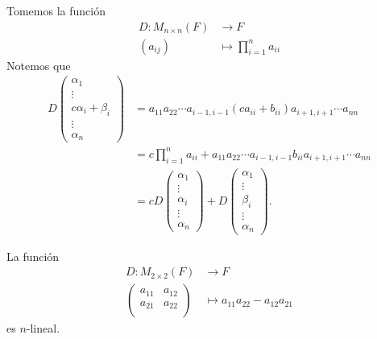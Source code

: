 \documentclass[12pt,a4paper]{book}
\begin{document}
    \begin{ejemplo}
        Tomemos la función
        \begin{align*}
            D: M_{n \times n}(F) & \longrightarrow F\\
            (a_{ij}) & \longmapsto \prod_{i = 1}^na_{ii}
        \end{align*}
        Notemos que 
        \begin{align*}
            D\begin{pmatrix}
                \alpha_1\\
                \vdots\\
                c \alpha_i + \beta_i\\
                \vdots\\
                \alpha_n
            \end{pmatrix} & =
            a_{11}a_{22} \dotsi a_{i-1,i-1}(ca_{ii} + b_{ii})a_{i + 1, i + 1}\dotsi a_{nn}\\
            & = c \prod_{i = 1}^na_{ii} + a_{11}a_{22} \dotsi a_{i-1,i-1}b_{ii}a_{i + 1, i + 1}\dotsi a_{nn}\\
            & = cD
            \begin{pmatrix}
                \alpha_1\\
                \vdots\\
                \alpha_i\\
                \vdots\\
                \alpha_n
            \end{pmatrix} + D
            \begin{pmatrix}
                \alpha_1\\
                \vdots\\
                \beta_i\\
                \vdots\\
                \alpha_n
            \end{pmatrix}.
        \end{align*}
    \end{ejemplo}

    \begin{proposicion}
        La función
        \begin{align*}
            D: M_{2 \times 2}(F) & \longrightarrow F\\
            \begin{pmatrix}
                a_{11} & a_{12}\\
                a_{21} & a_{22}\\
            \end{pmatrix} & \longmapsto a_{11}a_{22} - a_{12}a_{21}
        \end{align*}
        es $n$-lineal.
    \end{proposicion}
    
\end{document}
